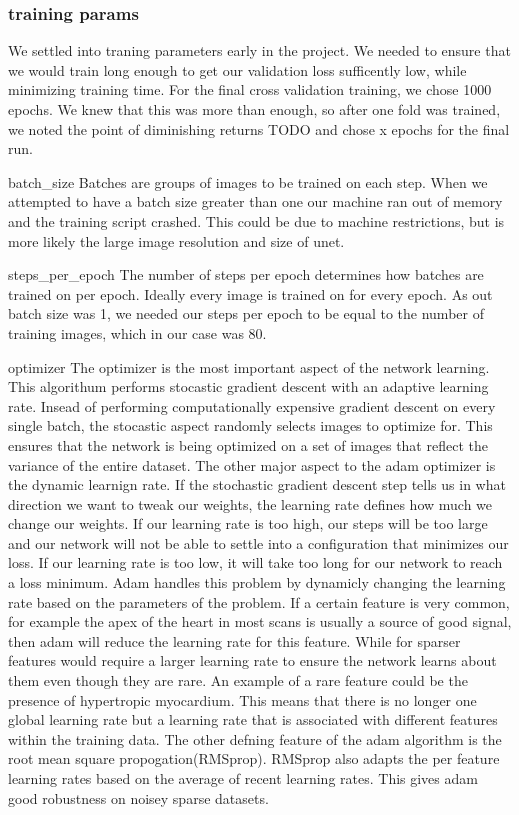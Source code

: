 \documentclass[12pt]{article}
\begin{document}
\subsubsection{training params}
We settled into traning parameters early in the project.
We needed to ensure that we would train long enough to get our validation loss sufficently low, while minimizing training time.
For the final cross validation training, we chose 1000 epochs.
We knew that this was more than enough, so after one fold was trained, we noted the point of diminishing returns TODO and chose x epochs for the final run.

batch\_size
Batches are groups of images to be trained on each step.
When we attempted to have a batch size greater than one our machine ran out of memory and the training script crashed.
This could be due to machine restrictions, but is more likely the large image resolution and size of unet.

steps\_per\_epoch
The number of steps per epoch determines how batches are trained on per epoch.
Ideally every image is trained on for every epoch.
As out batch size was 1, we needed our steps per epoch to be equal to the number of training images, which in our case was 80.

optimizer
The optimizer is the most important aspect of the network learning.
This algorithum performs stocastic gradient descent with an adaptive learning rate.
Insead of performing computationally expensive gradient descent on every single batch, the stocastic aspect randomly selects images to optimize for.
This ensures that the network is being optimized on a set of images that reflect the variance of the entire dataset.
The other major aspect to the adam optimizer is the dynamic learnign rate.
If the stochastic gradient descent step tells us in what direction we want to tweak our weights, the learning rate defines how much we change our weights.
If our learning rate is too high, our steps will be too large and our network will not be able to settle into a configuration that minimizes our loss.
If our learning rate is too low, it will take too long for our network to reach a loss minimum.
Adam handles this problem by dynamicly changing the learning rate based on the parameters of the problem.
If a certain feature is very common, for example the apex of the heart in most scans is usually a source of good signal, then adam will reduce the learning rate for this feature.
While for sparser features would require a larger learning rate to ensure the network learns about them even though they are rare.
An example of a rare feature could be the presence of hypertropic myocardium.
This means that there is no longer one global learning rate but a learning rate that is associated with different features within the training data.
The other defning feature of the adam algorithm is the root mean square propogation(RMSprop).
RMSprop also adapts the per feature learning rates based on the average of recent learning rates.
This gives adam good robustness on noisey sparse datasets.\cite{adam_opt}
\end{document}
